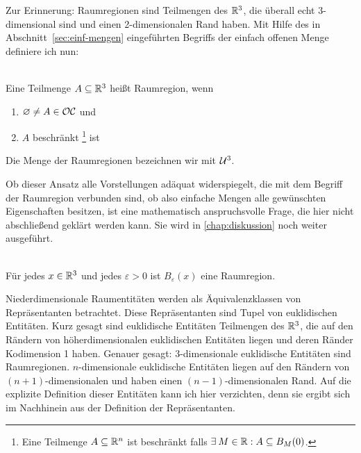     Zur Erinnerung: Raumregionen sind Teilmengen des $\mathbb{R}^3$, die überall echt 3-dimensional sind und einen 2-dimensionalen Rand haben.%
    Mit Hilfe des in Abschnitt~\ref{sec:einf-mengen} eingeführten Begriffs der einfach offenen Menge definiere ich nun:
    
    \begin{dfn}[Raumregion]\ \\
        Eine Teilmenge $A \subseteq \mathbb{R}^3$ heißt Raumregion, wenn
        \begin{enumerate}
            \item $\varnothing \neq A \in \mathcal{OC}$ und
            \item $A$ beschränkt%
                  \footnote{Eine Teilmenge $A \subseteq \mathbb{R}^n$ ist beschränkt falls $\exists\: M \in \mathbb{R} : A \subseteq B_M(0)$.}
                  ist
        \end{enumerate}
        Die Menge der Raumregionen bezeichnen wir mit $\mathcal{U}^3$.
    \end{dfn}
    Ob dieser Ansatz alle Vorstellungen adäquat widerspiegelt, die mit dem Begriff der Raumregion verbunden sind, ob also einfache Mengen alle gewünschten Eigenschaften besitzen, ist eine mathematisch anspruchsvolle Frage, die hier nicht abschließend geklärt werden kann. Sie wird in \ref{chap:diskussion} noch weiter ausgeführt.
    
    \begin{bsp}\ \\
        Für jedes $x \in \mathbb{R}^3$ und jedes $\varepsilon > 0$ ist $B_\varepsilon(x)$ eine Raumregion.
    \end{bsp}
    
    
    Niederdimensionale Raumentitäten werden als Äquivalenzklassen von Repräsentanten betrachtet.
    Diese Repräsentanten sind Tupel von euklidischen Entitäten.%
    Kurz gesagt sind euklidische Entitäten Teilmengen des $\mathbb{R}^3$, die auf den Rändern von höherdimensionalen euklidischen Entitäten liegen und deren Ränder Kodimension 1 haben.
    Genauer gesagt: 3-dimensionale euklidische Entitäten sind Raumregionen.
    $n$-dimensionale euklidische Entitäten liegen auf den Rändern von $(n+1)$-dimensionalen und haben einen $(n-1)$-dimensionalen Rand.
    Auf die explizite Definition dieser Entitäten kann ich hier verzichten, denn sie ergibt sich im Nachhinein aus der Definition der Repräsentanten.

